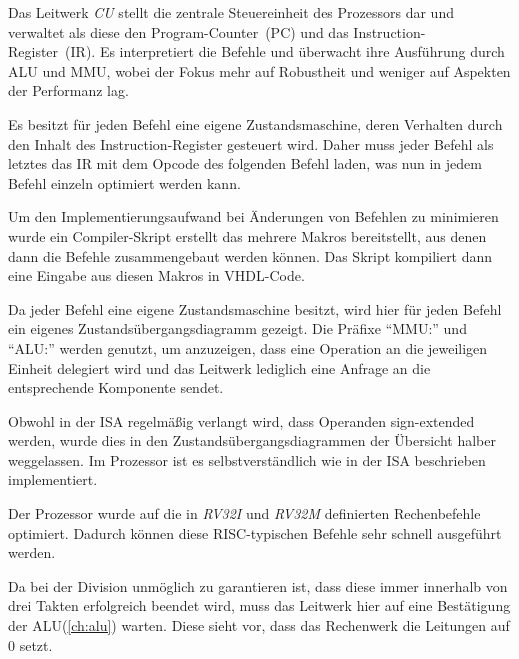 
\label{ch:cu}

Das Leitwerk \textit{CU} stellt die zentrale Steuereinheit des Prozessors dar und
verwaltet als diese den Program-Counter~(PC) und das Instruction-Register~(IR). Es
interpretiert die Befehle und \"uberwacht ihre Ausf\"uhrung durch ALU und MMU, wobei
der Fokus mehr auf Robustheit und weniger auf Aspekten der
Performanz lag.

Es besitzt f\"ur jeden Befehl eine eigene Zustandsmaschine, deren Verhalten 
durch den Inhalt des Instruction-Register gesteuert wird. Daher muss jeder
Befehl als letztes das IR mit dem Opcode des folgenden Befehl laden, was nun
in jedem Befehl einzeln optimiert werden kann.

Um den Implementierungsaufwand bei \"Anderungen von Befehlen zu minimieren
wurde ein Compiler-Skript erstellt das mehrere Makros bereitstellt, aus denen
dann die Befehle zusammengebaut werden k\"onnen. Das Skript kompiliert dann
eine Eingabe aus diesen Makros in VHDL-Code.

Da jeder Befehl eine eigene Zustandsmaschine besitzt, wird hier f\"ur jeden
Befehl ein eigenes Zustands\-\"uber\-gangs\-dia\-gramm gezeigt. Die Pr\"afixe
``MMU:'' und ``ALU:'' werden genutzt, um anzuzeigen, dass eine Operation an die
jeweiligen Einheit delegiert wird und das Leitwerk lediglich eine Anfrage an
die entsprechende Komponente sendet.

Obwohl in der ISA regelm\"a\ss{}ig verlangt wird, dass Operanden sign-extended
werden, wurde dies in den Zustands\-\"uber\-gangs\-dia\-grammen der \"Ubersicht
halber weggelassen. Im Prozessor ist es selbstverst\"andlich wie in der ISA
beschrieben implementiert.

Der Prozessor wurde auf die in \textit{RV32I} und \textit{RV32M} definierten Rechenbefehle
optimiert. Dadurch k\"onnen diese RISC-typischen Befehle sehr schnell
ausgef\"uhrt werden.


Da bei der Division unm\"oglich zu garantieren ist, dass diese immer innerhalb
von drei Takten erfolgreich beendet wird, muss das Leitwerk hier auf eine
Best\"atigung der ALU(\ref{ch:alu}) warten. Diese sieht vor, dass das Rechenwerk
die Leitungen  auf 0 setzt.

